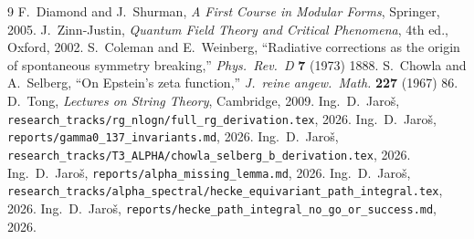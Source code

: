 \documentclass[12pt,a4paper]{article}
\theoremstyle{definition}
\theoremstyle{remark}
\begin{document}
\begin{thebibliography}{9}
 F.\ Diamond and J.\ Shurman, \emph{A First Course in Modular
  Forms}, Springer, 2005.
 J.\ Zinn-Justin, \emph{Quantum Field Theory and Critical
  Phenomena}, 4th ed., Oxford, 2002.
 S.\ Coleman and E.\ Weinberg, ``Radiative corrections as the
  origin of spontaneous symmetry breaking,'' \emph{Phys.\ Rev.\ D}
  \textbf{7} (1973) 1888.
 S.\ Chowla and A.\ Selberg, ``On Epstein's zeta function,''
  \emph{J.\ reine angew.\ Math.} \textbf{227} (1967) 86.
 D.\ Tong, \emph{Lectures on String Theory}, Cambridge, 2009.
 Ing.\ D.\ Jaro\v{s},
  \texttt{research\_tracks/rg\_nlogn/full\_rg\_derivation.tex}, 2026.
 Ing.\ D.\ Jaro\v{s},
  \texttt{reports/gamma0\_137\_invariants.md}, 2026.
 Ing.\ D.\ Jaro\v{s},
  \texttt{research\_tracks/T3\_ALPHA/chowla\_selberg\_b\_derivation.tex}, 2026.
 Ing.\ D.\ Jaro\v{s},
  \texttt{reports/alpha\_missing\_lemma.md}, 2026.
 Ing.\ D.\ Jaro\v{s},
  \texttt{research\_tracks/alpha\_spectral/hecke\_equivariant\_path\_integral.tex},
  2026.
 Ing.\ D.\ Jaro\v{s},
  \texttt{reports/hecke\_path\_integral\_no\_go\_or\_success.md}, 2026.
\end{thebibliography}
\end{document}
